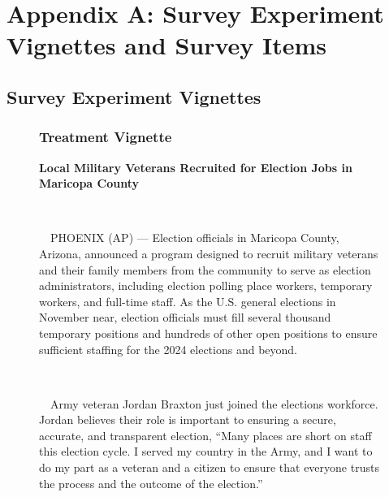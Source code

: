 \documentclass[
  12pt,
  letterpaper,
]{article}
\begin{document}
\newpage{}

\section{Appendix A: Survey Experiment Vignettes and Survey
Items}\label{appendix-a-survey-experiment-vignettes-and-survey-items}

\subsection{Survey Experiment
Vignettes}\label{survey-experiment-vignettes}

\begin{figure}

\begin{minipage}{0.45\linewidth}

\subsubsection{Treatment Vignette}\label{treatment-vignette-1}

\textbf{Local Military Veterans Recruited for Election Jobs in Maricopa
County}\\
\strut \\
\strut ~~PHOENIX (AP) --- Election officials in Maricopa County,
Arizona, announced a program designed to recruit military veterans and
their family members from the community to serve as election
administrators, including election polling place workers, temporary
workers, and full-time staff. As the U.S. general elections in November
near, election officials must fill several thousand temporary positions
and hundreds of other open positions to ensure sufficient staffing for
the 2024 elections and beyond.\\
\strut \\
\strut ~~Army veteran Jordan Braxton just joined the elections
workforce. Jordan believes their role is important to ensuring a secure,
accurate, and transparent election, ``Many places are short on staff
this election cycle. I served my country in the Army, and I want to do
my part as a veteran and a citizen to ensure that everyone trusts the
process and the outcome of the election.''

\end{minipage}%
%
\begin{minipage}{0.10\linewidth}
~\end{minipage}%
%
\begin{minipage}{0.45\linewidth}


\end{minipage}
\end{figure}
\end{document}
